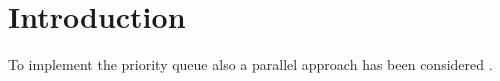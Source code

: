 \section{Introduction}
To implement the priority queue also a parallel approach has been considered \cite{BRODAL19984}.
